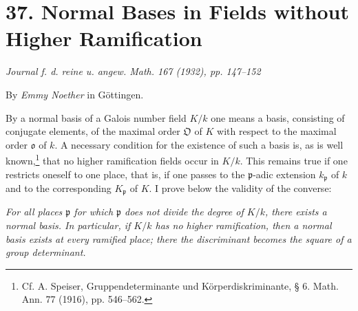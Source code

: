 \documentclass[11pt]{article}
\providecommand{\frakO}{\mathfrak O}
\providecommand{\frako}{\mathfrak o}
\providecommand{\frakp}{\mathfrak p}
\begin{document}
\section*{37. Normal Bases in Fields without Higher Ramification}

\begin{center}
\emph{Journal f. d. reine u. angew. Math. 167 (1932), pp. 147--152}
\end{center}

\begin{center}
By \emph{Emmy Noether} in Göttingen.
\end{center}

By a normal basis of a Galois number field \(K/k\) one means a basis, consisting of conjugate elements, of the maximal order \(\frakO\) of \(K\) with respect to the maximal order \(\frako\) of \(k\). A necessary condition for the existence of such a basis is, as is well known,\footnote{Cf. A. Speiser, Gruppendeterminante und Körperdiskriminante, § 6. Math. Ann. 77 (1916), pp. 546--562.} that no higher ramification fields occur in \(K/k\). This remains true if one restricts oneself to one place, that is, if one passes to the \(\frakp\)-adic extension \(k_\frakp\) of \(k\) and to the corresponding \(K_\frakp\) of \(K\). I prove below the validity of the converse:

\emph{For all places \(\frakp\) for which \(\frakp\) does not divide the degree of \(K/k\), there exists a normal basis. In particular, if \(K/k\) has no higher ramification, then a normal basis exists at every ramified place; there the discriminant becomes the square of a group determinant.}
\end{document}
